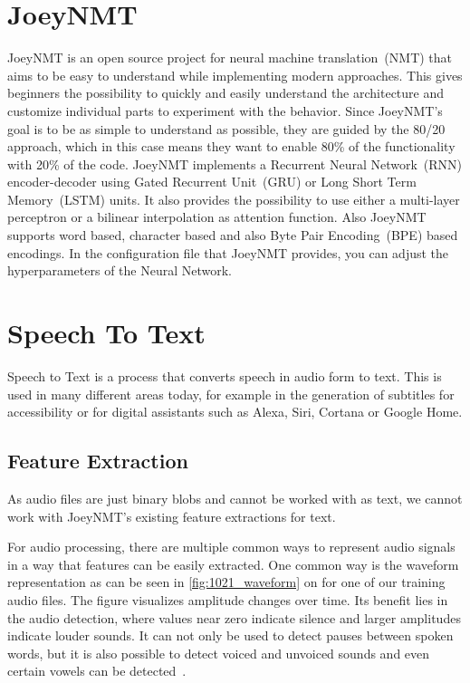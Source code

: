 \documentclass[11pt,a4paper]{article}
\begin{document}
\section{JoeyNMT}
JoeyNMT is an open source project for neural machine
translation~(NMT) that aims to be easy to understand while implementing modern approaches.
This gives beginners the possibility to quickly and easily understand the architecture and customize individual parts to experiment with the behavior.
Since JoeyNMT's goal is to be as simple to understand as possible, they are guided by the 80/20 approach, which in this case means they want to enable 80\% of the functionality with 20\% of the code.
JoeyNMT implements a Recurrent Neural Network~(RNN) encoder-decoder using Gated Recurrent Unit~(GRU) or Long Short Term Memory~(LSTM) units.
It also provides the possibility to use either a multi-layer perceptron or a bilinear interpolation as attention function.
Also JoeyNMT supports word based, character based and also Byte Pair Encoding~(BPE) based encodings.
In the configuration file that JoeyNMT provides, you can adjust the hyperparameters of the Neural Network. 
\cite{DBLP:journals/corr/abs-1907-12484}

\section{Speech To Text}

Speech to Text is a process that converts speech in audio form to text. 
This is used in many different areas today, for example in the generation of subtitles for accessibility or for digital assistants such as Alexa, Siri, Cortana or Google Home.

\subsection{Feature Extraction}

As audio files are just binary blobs and cannot be worked with as text,
we cannot work with JoeyNMT's existing feature extractions for text.

For audio processing, there are multiple common ways to represent audio signals in a way that features can be easily extracted.
One common way is the waveform representation as can be seen in \autoref{fig:1021_waveform} on  for one of our training audio files.
The figure visualizes amplitude changes over time.
Its benefit lies in the audio detection, where values near zero indicate silence
and larger amplitudes indicate louder sounds.
It can not only be used to detect pauses between spoken words, but it is also possible to detect voiced and unvoiced sounds and even certain vowels can be detected~\cite{Comer_1162014}.
\end{document}
